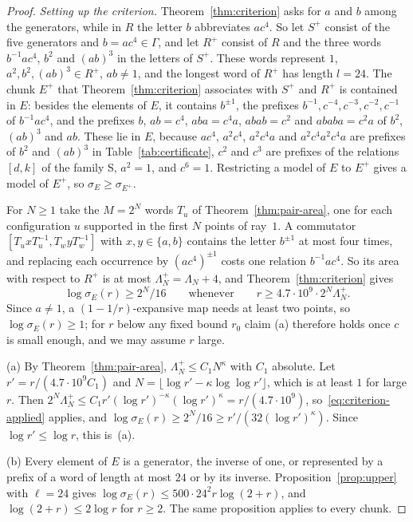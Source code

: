 \begin{proof}
\emph{Setting up the criterion.} Theorem~\ref{thm:criterion} asks for $a$ and $b$ among the generators, while in $R$ the letter $b$ abbreviates
$ac^4$. So let $S^+$ consist of the five generators and $b=ac^4\in\Gamma$, and let $R^+$ consist of $R$ and the three words $b^{-1}ac^4$, $b^2$
and $(ab)^3$ in the letters of $S^+$. These words represent $1$, $a^2,b^2,(ab)^3\in R^+$, $ab\ne1$, and the longest word of $R^+$ has length
$l=24$. The chunk $E^+$ that Theorem~\ref{thm:criterion} associates with $S^+$ and $R^+$ is contained in $E$: besides the elements of $E$, it
contains $b^{\pm1}$, the prefixes $b^{-1},c^{-4},c^{-3},c^{-2},c^{-1}$ of $b^{-1}ac^4$, and the prefixes $b$, $ab=c^4$, $aba=c^4a$, $abab=c^2$ and
$ababa=c^2a$ of $b^2$, $(ab)^3$ and $ab$. These lie in $E$, because $ac^4$, $a^2c^4$, $a^2c^4a$ and $a^2c^4a^2c^4a$ are prefixes of $b^2$ and
$(ab)^3$ in Table~\ref{tab:certificate}, $c^2$ and $c^3$ are prefixes of the relations $[d,k]$ of the family \textsf{S}, $a^2=1$, and $c^6=1$.
Restricting a model of $E$ to $E^+$ gives a model of $E^+$, so $\sigma_E\ge\sigma_{E^+}$.

For $N\ge1$ take the $M=2^N$ words $T_u$ of Theorem~\ref{thm:pair-area}, one for each configuration $u$ supported in the first $N$ points of
ray~$1$. A commutator $[T_uxT_u^{-1},T_wyT_w^{-1}]$ with $x,y\in\{a,b\}$ contains the letter $b^{\pm1}$ at most four times, and replacing each
occurrence by $(ac^4)^{\pm1}$ costs one relation $b^{-1}ac^4$. So its area with respect to $R^+$ is at most $\Lambda^+_N=\Lambda_N+4$, and
Theorem~\ref{thm:criterion} gives
\begin{equation}\label{eq:criterion-applied}
\log\sigma_E(r)\ge2^N/16\qquad\text{whenever}\qquad r\ge4.7\cdot10^{9}\cdot2^N\Lambda^+_N .
\end{equation}
Since $a\ne1$, a $(1-1/r)$-expansive map needs at least two points, so $\log\sigma_E(r)\ge1$; for $r$ below any fixed bound $r_0$ claim (a)
therefore holds once $c$ is small enough, and we may assume $r$ large.

(a) By Theorem~\ref{thm:pair-area}, $\Lambda^+_N\le C_1N^\kappa$ with $C_1$ absolute. Let $r'=r/(4.7\cdot10^9C_1)$ and
$N=\lfloor\log r'-\kappa\log\log r'\rfloor$, which is at least $1$ for large $r$. Then
$2^N\Lambda^+_N\le C_1r'(\log r')^{-\kappa}(\log r')^\kappa=r/(4.7\cdot10^9)$, so~\eqref{eq:criterion-applied} applies, and
$\log\sigma_E(r)\ge2^N/16\ge r'/(32(\log r')^\kappa)$. Since $\log r'\le\log r$, this is~(a).

(b) Every element of $E$ is a generator, the inverse of one, or represented by a prefix of a word of length at most $24$ or by its inverse.
Proposition~\ref{prop:upper} with $\ell=24$ gives $\log\sigma_E(r)\le500\cdot24^2r\log(2+r)$, and $\log(2+r)\le2\log r$ for $r\ge2$. The same
proposition applies to every chunk.


\end{proof}
